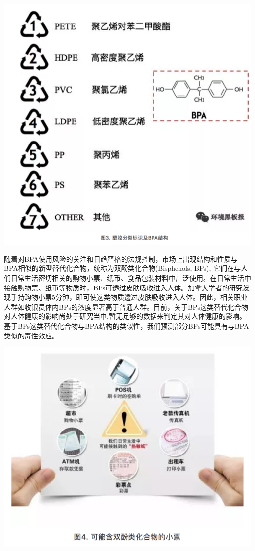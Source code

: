 \documentclass[
]{book}
\begin{document}
\includegraphics[width=8.33in]{images/epc3}

随着对BPA使用风险的关注和日趋严格的法规控制，市场上出现结构和性质与BPA相似的新型替代化合物，统称为双酚类化合物(Bisphenols, BPs), 它们在与人们日常生活密切相关的购物小票、纸币、食品包装材料中广泛使用。在日常生活中接触购物票、纸币等物质时，BPs可透过皮肤吸收进入人体。加拿大学者的研究发现手持购物小票5分钟，即可使这类物质透过皮肤吸收进入人体。因此，相关职业人群如收银员体内BPs的浓度显著高于普通人群。目前，关于BPs这类替代化合物对人体健康的影响尚处于研究当中,暂无足够的数据来判定其对人体健康的影响。基于BPs这类替代化合物与BPA结构的类似性，我们预测部分BPs可能具有与BPA类似的毒性效应。

\includegraphics[width=8.33in]{images/epc4}
\end{document}
